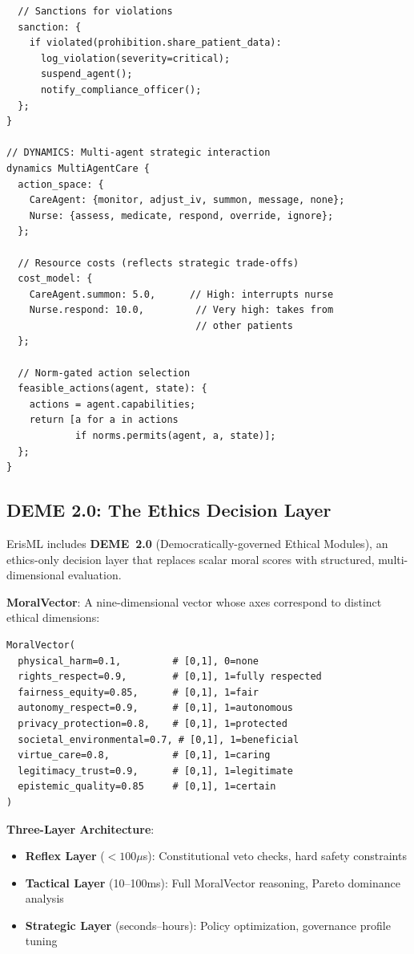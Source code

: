 \documentclass[conference]{IEEEtran}
\begin{document}
\begin{lstlisting}
  // Sanctions for violations
  sanction: {
    if violated(prohibition.share_patient_data):
      log_violation(severity=critical);
      suspend_agent();
      notify_compliance_officer();
  };
}

// DYNAMICS: Multi-agent strategic interaction
dynamics MultiAgentCare {
  action_space: {
    CareAgent: {monitor, adjust_iv, summon, message, none};
    Nurse: {assess, medicate, respond, override, ignore};
  };

  // Resource costs (reflects strategic trade-offs)
  cost_model: {
    CareAgent.summon: 5.0,      // High: interrupts nurse
    Nurse.respond: 10.0,         // Very high: takes from
                                 // other patients
  };

  // Norm-gated action selection
  feasible_actions(agent, state): {
    actions = agent.capabilities;
    return [a for a in actions
            if norms.permits(agent, a, state)];
  };
}
\end{lstlisting}

\subsection{DEME 2.0: The Ethics Decision Layer}

ErisML includes \textbf{DEME~2.0} (Democratically-governed Ethical Modules), an ethics-only decision layer that replaces scalar moral scores with structured, multi-dimensional evaluation.

\textbf{MoralVector}: A nine-dimensional vector whose axes correspond to distinct ethical dimensions:

\begin{lstlisting}
MoralVector(
  physical_harm=0.1,         # [0,1], 0=none
  rights_respect=0.9,        # [0,1], 1=fully respected
  fairness_equity=0.85,      # [0,1], 1=fair
  autonomy_respect=0.9,      # [0,1], 1=autonomous
  privacy_protection=0.8,    # [0,1], 1=protected
  societal_environmental=0.7, # [0,1], 1=beneficial
  virtue_care=0.8,           # [0,1], 1=caring
  legitimacy_trust=0.9,      # [0,1], 1=legitimate
  epistemic_quality=0.85     # [0,1], 1=certain
)
\end{lstlisting}

\textbf{Three-Layer Architecture}:
\begin{itemize}
\item \textbf{Reflex Layer} ($<100\mu$s): Constitutional veto checks, hard safety constraints
\item \textbf{Tactical Layer} (10--100ms): Full MoralVector reasoning, Pareto dominance analysis
\item \textbf{Strategic Layer} (seconds--hours): Policy optimization, governance profile tuning
\end{itemize}
\end{document}
